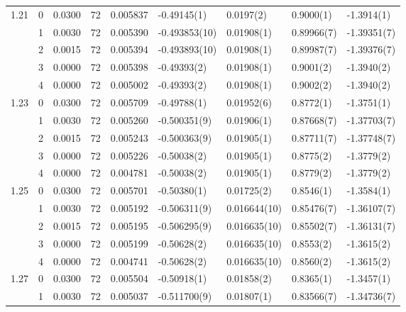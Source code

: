 \begin{tabular}{llrrrllll}
1.21 & 0 &    0.0300 &     72 &  0.005837 &     -0.49145(1) &       0.0197(2) &       0.9000(1) &     -1.3914(1) \\
     & 1 &    0.0030 &     72 &  0.005390 &   -0.493853(10) &      0.01908(1) &      0.89966(7) &    -1.39351(7) \\
     & 2 &    0.0015 &     72 &  0.005394 &   -0.493893(10) &      0.01908(1) &      0.89987(7) &    -1.39376(7) \\
     & 3 &    0.0000 &     72 &  0.005398 &     -0.49393(2) &      0.01908(1) &       0.9001(2) &     -1.3940(2) \\
     & 4 &    0.0000 &     72 &  0.005002 &     -0.49393(2) &      0.01908(1) &       0.9002(2) &     -1.3940(2) \\
1.23 & 0 &    0.0300 &     72 &  0.005709 &     -0.49788(1) &      0.01952(6) &       0.8772(1) &     -1.3751(1) \\
     & 1 &    0.0030 &     72 &  0.005260 &    -0.500351(9) &      0.01906(1) &      0.87668(7) &    -1.37703(7) \\
     & 2 &    0.0015 &     72 &  0.005243 &    -0.500363(9) &      0.01905(1) &      0.87711(7) &    -1.37748(7) \\
     & 3 &    0.0000 &     72 &  0.005226 &     -0.50038(2) &      0.01905(1) &       0.8775(2) &     -1.3779(2) \\
     & 4 &    0.0000 &     72 &  0.004781 &     -0.50038(2) &      0.01905(1) &       0.8779(2) &     -1.3779(2) \\
1.25 & 0 &    0.0300 &     72 &  0.005701 &     -0.50380(1) &      0.01725(2) &       0.8546(1) &     -1.3584(1) \\
     & 1 &    0.0030 &     72 &  0.005192 &    -0.506311(9) &    0.016644(10) &      0.85476(7) &    -1.36107(7) \\
     & 2 &    0.0015 &     72 &  0.005195 &    -0.506295(9) &    0.016635(10) &      0.85502(7) &    -1.36131(7) \\
     & 3 &    0.0000 &     72 &  0.005199 &     -0.50628(2) &    0.016635(10) &       0.8553(2) &     -1.3615(2) \\
     & 4 &    0.0000 &     72 &  0.004741 &     -0.50628(2) &    0.016635(10) &       0.8560(2) &     -1.3615(2) \\
1.27 & 0 &    0.0300 &     72 &  0.005504 &     -0.50918(1) &      0.01858(2) &       0.8365(1) &     -1.3457(1) \\
     & 1 &    0.0030 &     72 &  0.005037 &    -0.511700(9) &      0.01807(1) &      0.83566(7) &    -1.34736(7) \\

\end{tabular}
